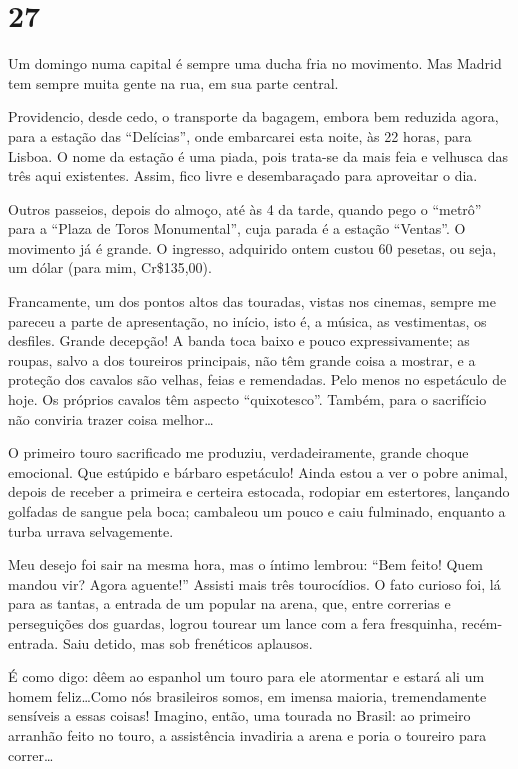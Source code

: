 \section*{27 \adfflatleafright {}}
Um domingo numa capital é sempre uma ducha fria no movimento. Mas Madrid tem sempre muita gente na rua, em sua parte central.

Providencio, desde cedo, o transporte da bagagem, embora bem reduzida agora, para a estação das “Delícias”, onde embarcarei esta noite, às 22 horas, para Lisboa. O nome da estação é uma piada, pois trata-se da mais feia e velhusca das três aqui existentes. Assim, fico livre e desembaraçado para aproveitar o dia.

Outros passeios, depois do almoço, até às 4 da tarde, quando pego o “metrô” para a “Plaza de Toros Monumental”, cuja parada é a estação “Ventas”. O movimento já é grande. O ingresso, adquirido ontem custou 60 pesetas, ou seja, um dólar (para mim, Cr\$135,00).

Francamente, um dos pontos altos das touradas, vistas nos cinemas, sempre me pareceu a parte de apresentação, no início, isto é, a música, as vestimentas, os desfiles. Grande decepção! A banda toca baixo e pouco expressivamente; as roupas, salvo a dos toureiros principais, não têm grande coisa a mostrar, e a proteção dos cavalos são velhas, feias e remendadas. Pelo menos no espetáculo de hoje. Os próprios cavalos têm aspecto “quixotesco”. Também, para o sacrifício não conviria trazer coisa melhor\ldots

O primeiro touro sacrificado me produziu, verdadeiramente, grande choque emocional. Que estúpido e bárbaro espetáculo! Ainda estou a ver o pobre animal, depois de receber a primeira e certeira estocada, rodopiar em estertores, lançando golfadas de sangue pela boca; cambaleou um pouco e caiu fulminado, enquanto a turba urrava selvagemente.

Meu desejo foi sair na mesma hora, mas o íntimo lembrou: “Bem feito! Quem mandou vir? Agora aguente!” Assisti mais três tourocídios. O fato curioso foi, lá para as tantas, a entrada de um popular na arena, que, entre correrias e perseguições dos guardas, logrou tourear um lance com a fera fresquinha, recém- entrada. Saiu detido, mas sob frenéticos aplausos.

É como digo: dêem ao espanhol um touro para ele atormentar e estará ali um homem feliz\ldots Como nós brasileiros somos, em imensa maioria, tremendamente sensíveis a essas coisas! Imagino, então, uma tourada no Brasil: ao primeiro arranhão feito no touro, a assistência invadiria a arena e poria o toureiro para correr\ldots

